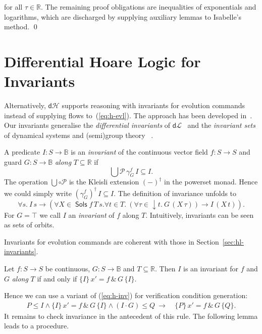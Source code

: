 \documentclass[envcountsame,envcountsect]{llncs}
\newcommand{\dL}{\mathsf{d}\mathcal{L}}
\newcommand{\dH}{\mathsf{d}\mathcal{H}}
\newcommand{\Pow}{\mathcal{P}}
\newcommand{\reals}{\mathbb{R}}
\newcommand{\bools}{\mathbb{B}}
\newcommand{\Sols}{\mathop{\mathsf{Sols}}}
\begin{document}
\begin{example}
for all $\tau\in\reals$. The remaining proof obligations are inequalities of exponentials and logarithms, which are discharged by supplying auxiliary lemmas to Isabelle's  method. \qed
\end{example}



\section{Differential Hoare Logic for Invariants}\label{sec:hoare-inv}

Alternatively, $\dH$ supports reasoning with invariants for evolution
commands instead of supplying flows to~(\ref{eq:h-evl}).  The approach
has been developed in~\cite{MuniveS19}. Our invariants generalise the
\emph{differential invariants} of $\dL$~\cite{Platzer18} and the
\emph{invariant sets} of dynamical systems and (semi)group
theory~\cite{Teschl12} .

A predicate $I:S\to\bools$ is an \emph{invariant} of the continuous
vector field $f:S\to S$ and guard $G:S\to\bools$ \emph{along}
$T\subseteq \reals$ if
\begin{equation*}
\bigcup \Pow\, \gamma^f_G\, I\subseteq  I.
\end{equation*}
The operation $\bigcup\circ\Pow$ is the Kleisli extension $(-)^\dagger$
in the powerset monad. Hence we could simply write
$(\gamma^f_G)^\dagger\, I \subseteq I$. The definition of invariance
unfolds to
\begin{equation*}
  \forall s.\ I\, s \to (\forall X\in\Sols f\, T\, s.\forall t\in T.\ (\forall \tau\in {\downarrow}t.\ G\, (X\, \tau)) \to I\, (X\, t)).
\end{equation*}
For $G=\top$ we call $I$ an \emph{invariant} of $f$ along $T$.
Intuitively, invariants can be seen as sets of orbits.

Invariants for evolution commands are coherent with those in Section~\ref{sec:hl-invariants}.
\begin{proposition}\label{P:inv-prop}
  Let $f:S\to S$ be continuous, $G:S\to\bools$ and
  $T\subseteq \reals$. Then $I$ is an invariant for $f$ and $G$ \emph{along} $T$ if and only if
$ \{I\}\, x' = f\, \&\, G\, \{I\}$.
\end{proposition}
Hence we can use a variant of (\ref{eq:h-inv}) for verification condition generation:
\begin{align}
  P\le I \land \{I\}\, x' = f\, \&\, G\, \{I\}\land (I\cdot G)\le Q\ \rightarrow\
  &\{P\}\, x' = f\, \&\, G\, \{Q\}.\label{eq:h-invg}\tag{h-invg}
\end{align}
It remains to check invariance in the antecedent of this rule. The
following lemma leads to a procedure.
\end{document}
